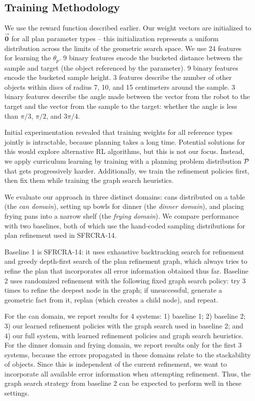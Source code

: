 \subsection{Training Methodology}
We use the reward function described earlier. Our weight
vectors are initialized to $\vec{\mathbf{0}}$ for all plan parameter types -- this
initialization represents a uniform distribution across the limits of the geometric search space.
We use 24 features for learning the $\theta_{p}$. 9 binary features encode the bucketed distance between the sample
and target (the object referenced by the parameter). 9 binary features encode the bucketed sample height. 3 features
describe the number of other objects within discs of radius 7, 10, and 15 centimeters around the
sample. 3 binary features describe the angle made between the vector from the
robot to the target and the vector from the sample to the target: whether the angle is less than
$\pi/3$, $\pi/2$, and $3\pi/4$.

Initial experimentation revealed that training weights for all reference types jointly is intractable,
because planning takes a long time. Potential solutions for this would explore alternative RL algorithms,
but this is not our focus. Instead, we apply curriculum learning by training with a planning problem distribution
$\mathcal{P}$ that gets progressively harder. Additionally, we train the refinement policies first, then fix them while
training the graph search heuristics.

We evaluate our approach in three distinct domains: cans distributed on a table (the \emph{can domain}),
setting up bowls for dinner (the \emph{dinner domain}), and placing frying pans into a narrow shelf (the \emph{frying domain}).
We compare performance with two baselines, both of which use the hand-coded sampling distributions for
plan refinement used in SFRCRA-14.

Baseline 1 is SFRCRA-14: it uses exhaustive backtracking search for refinement
and greedy depth-first search of the plan refinement graph, which always tries to refine
the plan that incorporates all error information obtained thus far.
Baseline 2 uses randomized refinement with the following fixed graph search policy: try 3 times to refine the deepest
node in the graph; if unsuccessful, generate a geometric fact from it, replan (which creates a child node), and repeat.

For the can domain, we report results for 4 systems: 1) baseline 1; 2) baseline 2; 3) our learned refinement policies
with the graph search used in baseline 2; and 4) our full system, with learned refinement policies and graph search heuristics.
For the dinner domain and frying domain, we report results only for the first 3 systems, because the errors propagated in these
domains relate to the stackability of objects. Since this is independent of the current refinement, we want to
incorporate all available error information when attempting refinement. Thus, the graph search strategy
from baseline 2 can be expected to perform well in these settings.

